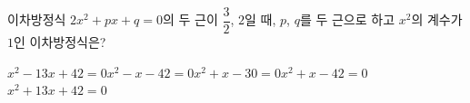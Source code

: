 이차방정식 $2x^2+px+q=0$의 두 근이 $\dfrac{3}{2}$, $2$일 때, $p$, $q$를 두 근으로 하고 $x^2$의 계수가 $1$인 이차방정식은? 
\begin{choicesii}{$x^2-13x+42=0$}{$x^2-x-42=0$}{$x^2+x-30=0$}{$x^2+x-42=0$}{$x^2+13x+42=0$}\end{choicesii}

